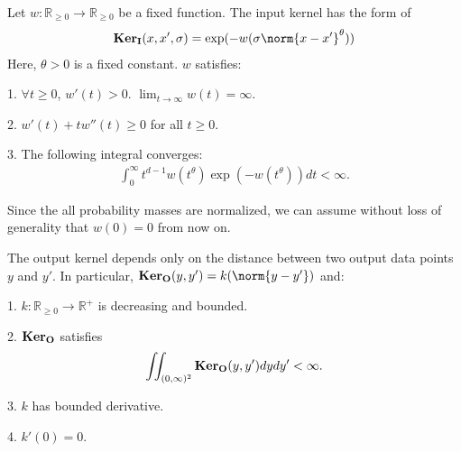 \begin{condition} \label{input_kernel_conditions}
    Let $w: \mathbb{R}_{\geq 0} \to \mathbb{R}_{\geq 0}$ be a fixed function. The input kernel has the form of
    \begin{align} \label{tsne:input_kernel}
        \ki(x,x',\sigma) = \exp(-w(\sigma\norm{x-x'}^{\theta}))
    \end{align}
    Here, $\theta>0$ is a fixed constant. $w$ satisfies:

    1. $\forall t \geq 0$, $w'(t)>0$. $\lim_{t \to \infty} w(t) = \infty$.

    2. $w'(t)+tw''(t) \geq 0$ for all $t \geq 0$.

    3. The following integral converges:
    \begin{align}
        \int_0^{\infty} t^{d-1} w(t^{\theta}) \exp(-w(t^{\theta}))dt < \infty.
    \end{align}
\end{condition}
Since the all probability masses are normalized, we can assume without loss of generality that $w(0)=0$ from now on.
\begin{condition} \label{output_kernel_conditions}
    The output kernel depends only on the distance between two output data points $y$ and $y'$. In particular, $\ko(y,y') = k (\norm{y-y'})$ and:

    1. $k: \mathbb{R}_{\geq 0} \to \mathbb{R}^+$ is decreasing and bounded.

    2. $\mathbf{Ker}_{\mathbf{O}}$ satisfies
    \begin{align}
        \iint_{(0,\infty)^2} \mathbf{Ker}_{\mathbf{O}}(y,y') dy dy' < \infty.
    \end{align}

    3. $k$ has bounded derivative.

    4. $k'(0) = 0$.
\end{condition}

